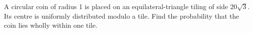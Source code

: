 A circular coin of radius 1 is placed on an equilateral-triangle tiling of side $20\sqrt3$. Its centre is uniformly distributed modulo a tile. Find the probability that the coin lies wholly within one tile.
